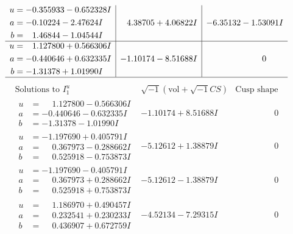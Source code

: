 \documentclass[1p]{elsarticle_modified}
\theoremstyle{definition}
\newcommand{\I}{\sqrt{-1}}
\begin{document}
$$\begin{array}{c|c|c}
\begin{aligned}
u &= -0.355933 - 0.652328 I \\
a &= -0.10224 - 2.47624 I \\
b &= \phantom{-}1.46844 - 1.04544 I\end{aligned}
 & \phantom{-}4.38705 + 4.06822 I & -6.35132 - 1.53091 I \\ \hline\begin{aligned}
u &= \phantom{-}1.127800 + 0.566306 I \\
a &= -0.440646 + 0.632335 I \\
b &= -1.31378 + 1.01990 I\end{aligned}
 & -1.10174 - 8.51688 I & \phantom{-0.000000 } 0\\
 \hline 
 \end{array}$$\newpage$$\begin{array}{c|c|c}  
\text{Solutions to }I^u_{1}& \I (\text{vol} + \sqrt{-1}CS) & \text{Cusp shape}\\
 \hline 
\begin{aligned}
u &= \phantom{-}1.127800 - 0.566306 I \\
a &= -0.440646 - 0.632335 I \\
b &= -1.31378 - 1.01990 I\end{aligned}
 & -1.10174 + 8.51688 I & \phantom{-0.000000 } 0 \\ \hline\begin{aligned}
u &= -1.197690 + 0.405791 I \\
a &= \phantom{-}0.367973 - 0.288662 I \\
b &= \phantom{-}0.525918 - 0.753873 I\end{aligned}
 & -5.12612 + 1.38879 I & \phantom{-0.000000 } 0 \\ \hline\begin{aligned}
u &= -1.197690 - 0.405791 I \\
a &= \phantom{-}0.367973 + 0.288662 I \\
b &= \phantom{-}0.525918 + 0.753873 I\end{aligned}
 & -5.12612 - 1.38879 I & \phantom{-0.000000 } 0 \\ \hline\begin{aligned}
u &= \phantom{-}1.186970 + 0.490457 I \\
a &= \phantom{-}0.232541 + 0.230233 I \\
b &= \phantom{-}0.436907 + 0.672759 I\end{aligned}
 & -4.52134 - 7.29315 I & \phantom{-0.000000 } 0 \\ \hline\begin{aligned}

\end{aligned}
\end{array}$$
\end{document}
